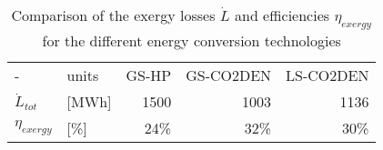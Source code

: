 \begin{table}[htp]
\centering
\caption{Comparison of the exergy losses $\dot{L}$ and efficiencies $\eta_{exergy}$ for the different energy conversion technologies}\vspace{2mm}
\label{tab:V_exergy} 
\begin{tabular}{llrrr} \toprule
	-                    & units & GS-HP & GS-CO2DEN & LS-CO2DEN \\
	$\dot{L}_{tot}$            & [MWh] & 1500   & 1003       & 1136       \\
	$\eta_{exergy}$      & [\%]  & 24\%   & 32\%       & 30\%       \\
 \bottomrule
	\end{tabular}
\end{table}
